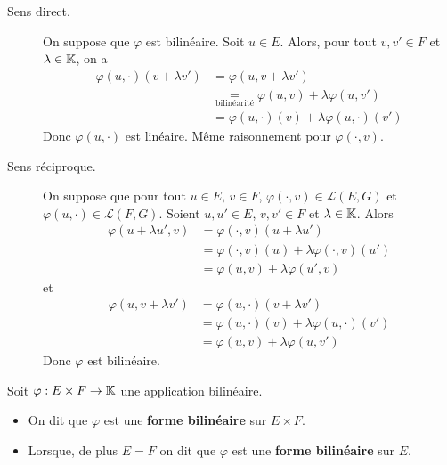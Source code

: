 \documentclass[a4paper, 12pt]{article}
\begin{document}
\begin{demonstration}
    \begin{description}
        \item[Sens direct.]
        On suppose que $\varphi$ est bilinéaire. Soit $u \in E$. Alors, pour tout $v, v' \in F$ et $\lambda \in \mathbb{K}$, on a
        \begin{align*}
            \varphi(u, \cdot)(v + \lambda v') &= \varphi(u, v + \lambda v') \\
            &\underset{\text{bilinéarité}}{=} \varphi(u, v) + \lambda \varphi(u, v') \\
            &= \varphi(u, \cdot)(v) + \lambda \varphi(u, \cdot)(v')
        \end{align*}
        Donc $\varphi(u, \cdot)$ est linéaire. Même raisonnement pour $\varphi(\cdot, v)$.

        \item[Sens réciproque.]
        On suppose que pour tout $u \in E$, $v \in F$, $\varphi(\cdot, v) \in \mathcal{L}(E, G)$ et $\varphi(u, \cdot) \in \mathcal{L}(F, G)$. Soient $u, u' \in E$, $v, v' \in F$ et $\lambda \in \mathbb{K}$. Alors
        \begin{align*}
            \varphi(u + \lambda u', v) &= \varphi(\cdot, v)(u + \lambda u') \\
            &= \varphi(\cdot, v)(u) + \lambda \varphi(\cdot, v)(u') \\
            &= \varphi(u, v) + \lambda \varphi(u', v)
        \end{align*}
        et
        \begin{align*}
            \varphi(u, v + \lambda v') &= \varphi(u, \cdot)(v + \lambda v') \\
            &= \varphi(u, \cdot)(v) + \lambda \varphi(u, \cdot)(v') \\
            &= \varphi(u, v) + \lambda \varphi(u, v')
        \end{align*}
        Donc $\varphi$ est bilinéaire.
    \end{description}
\end{demonstration}

\begin{definition}
    Soit $\varphi: E \times F \to \mathbb{K}$ une application bilinéaire.
    \begin{itemize}[label=--]
        \item On dit que $\varphi$ est une \textbf{forme bilinéaire} sur $E \times F$.
        \item Lorsque, de plus $E = F$ on dit que $\varphi$ est une \textbf{forme bilinéaire} sur $E$.
    \end{itemize}
\end{definition}
\end{document}
